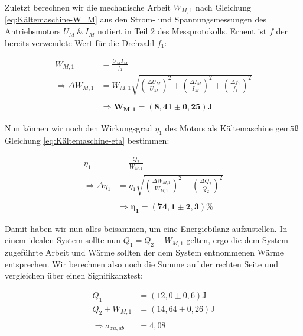 \documentclass{article}
\begin{document}
Zuletzt berechnen wir die mechanische Arbeit $W_{M,1}$ nach Gleichung \ref{eq:Kältemaschine-W_M} aus den Strom- und Spannungsmessungen des Antriebsmotors $U_M \ \& \ I_M$ notiert in Teil 2 des Messprotokolls. Erneut ist $f$ der bereits verwendete Wert für die Drehzahl $f_1$:

\begin{equation}
    \begin{split}
        W_{M,1} &= \frac{U_M I_M}{f_1} \\
        \Rightarrow \Delta W_{M,1} &= W_{M,1} \sqrt{\left( \frac{\Delta U_M}{U_M} \right)^2 + \left( \frac{\Delta I_M}{I_M} \right)^2 + \left( \frac{\Delta f_1}{f_1} \right)^2} \\ \\
        &\Rightarrow \bm{W_{M,1}} = \bm{(8,41 \pm 0,25)} \textbf{J}
    \end{split}
\end{equation}

Nun können wir noch den Wirkungsgrad $\eta_1$ des Motors als Kältemaschine gemäß Gleichung \ref{eq:Kältemaschine-eta} bestimmen:

\begin{equation}
    \begin{split}
        \eta_1 &= \frac{Q_2}{W_{M,1}} \\
        \Rightarrow \Delta \eta_1 &= \eta_1 \sqrt{\left( \frac{\Delta W_{M,1}}{W_{M,1}} \right)^2 + \left(  \frac{\Delta Q_2}{Q_2} \right)^2} \\ \\
        &\Rightarrow \bm{\eta_1} = \bm{(74,1 \pm 2,3)} \%
    \end{split}
\end{equation}

Damit haben wir nun alles beisammen, um eine Energiebilanz aufzustellen. In einem idealen System sollte nun $Q_1 = Q_2 + W_{M,1}$ gelten, ergo die dem System zugeführte Arbeit und Wärme sollten der dem System entnommenen Wärme entsprechen. Wir berechnen also noch die Summe auf der rechten Seite und vergleichen über einen Signifikanztest:

\begin{equation}
    \begin{split}
        Q_1 &= (12,0 \pm 0,6) \text{J} \\
        Q_2 + W_{M,1} &= (14,64 \pm 0,26) \text{J} \\ \\
        \Rightarrow \sigma_{zu, ab} &= 4,08
    \end{split}
\end{equation}
\end{document}

